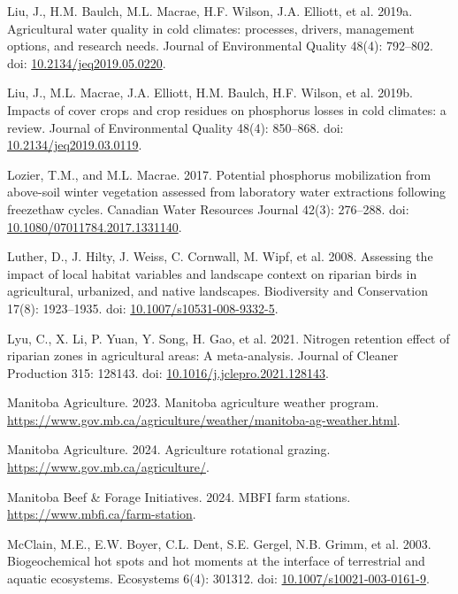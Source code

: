\documentclass[
]{agujournal2019}
\newlength{\cslhangindent}
\newenvironment{CSLReferences}[2] %
 {\begin{list}{}{%
  \setlength{\itemindent}{0pt}
  \setlength{\leftmargin}{0pt}
  \setlength{\parsep}{0pt}
  \ifodd #1
   \setlength{\leftmargin}{\cslhangindent}
   \setlength{\itemindent}{-1\cslhangindent}
  \fi
  \setlength{\itemsep}{#2\baselineskip}}}
 {\end{list}}
\begin{document}
\begin{CSLReferences}{1}{1}
Liu, J., H.M. Baulch, M.L. Macrae, H.F. Wilson, J.A. Elliott, et al.
2019a. Agricultural water quality in cold climates: processes, drivers,
management options, and research needs. Journal of Environmental Quality
48(4): 792--802. doi:
\href{https://doi.org/10.2134/jeq2019.05.0220}{10.2134/jeq2019.05.0220}.

Liu, J., M.L. Macrae, J.A. Elliott, H.M. Baulch, H.F. Wilson, et al.
2019b. Impacts of cover crops and crop residues on phosphorus losses in
cold climates: a review. Journal of Environmental Quality 48(4):
850--868. doi:
\href{https://doi.org/10.2134/jeq2019.03.0119}{10.2134/jeq2019.03.0119}.

Lozier, T.M., and M.L. Macrae. 2017. Potential phosphorus mobilization
from above-soil winter vegetation assessed from laboratory water
extractions following freeze{\textendash}thaw cycles. Canadian Water
Resources Journal 42(3): 276--288. doi:
\href{https://doi.org/10.1080/07011784.2017.1331140}{10.1080/07011784.2017.1331140}.

Luther, D., J. Hilty, J. Weiss, C. Cornwall, M. Wipf, et al. 2008.
Assessing the impact of local habitat variables and landscape context on
riparian birds in agricultural, urbanized, and native landscapes.
Biodiversity and Conservation 17(8): 1923--1935. doi:
\href{https://doi.org/10.1007/s10531-008-9332-5}{10.1007/s10531-008-9332-5}.

Lyu, C., X. Li, P. Yuan, Y. Song, H. Gao, et al. 2021. Nitrogen
retention effect of riparian zones in agricultural areas: A
meta-analysis. Journal of Cleaner Production 315: 128143. doi:
\href{https://doi.org/10.1016/j.jclepro.2021.128143}{10.1016/j.jclepro.2021.128143}.

Manitoba Agriculture. 2023. Manitoba agriculture weather program.
\url{https://www.gov.mb.ca/agriculture/weather/manitoba-ag-weather.html}.

Manitoba Agriculture. 2024. Agriculture rotational grazing.
\url{https://www.gov.mb.ca/agriculture/}.

Manitoba Beef \& Forage Initiatives. 2024. MBFI farm stations.
\url{https://www.mbfi.ca/farm-station}.

McClain, M.E., E.W. Boyer, C.L. Dent, S.E. Gergel, N.B. Grimm, et al.
2003. Biogeochemical hot spots and hot moments at the interface of
terrestrial and aquatic ecosystems. Ecosystems 6(4): 301312. doi:
\href{https://doi.org/10.1007/s10021-003-0161-9}{10.1007/s10021-003-0161-9}.


\end{CSLReferences}
\end{document}
